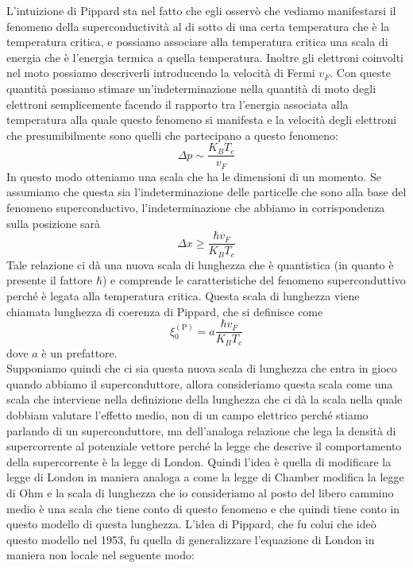 L'intuizione di Pippard sta nel fatto che egli osservò che vediamo manifestarsi il fenomeno della superconductività al di sotto di una certa temperatura che è la temperatura critica, e possiamo associare alla temperatura critica una scala di energia che è l'energia termica a quella temperatura. Inoltre gli elettroni coinvolti nel moto possiamo descriverli introducendo la velocità di Fermi $v_F$. Con queste quantità possiamo stimare un'indeterminazione nella quantità di moto degli elettroni semplicemente facendo il rapporto tra l'energia associata alla temperatura alla quale questo fenomeno si manifesta e la velocità degli elettroni che presumibilmente sono quelli che partecipano a questo fenomeno:
\begin{equation*}
   \Delta p
   \sim \frac{K_B T_c}{v_F}
\end{equation*}
In questo modo otteniamo una scala che ha le dimensioni di un momento. Se assumiamo che questa sia l'indeterminazione delle particelle che sono alla base del fenomeno superconductivo, l'indeterminazione che abbiamo in corrispondenza sulla posizione sarà
\begin{equation*}
   \Delta x
   \geq \frac{\hbar v_F}{K_B T_c}
\end{equation*}
Tale relazione ci dà una nuova scala di lunghezza che è quantistica (in quanto è presente il fattore $\hbar$) e comprende le caratteristiche del fenomeno superconduttivo perché è legata alla temperatura critica. Questa scala di lunghezza viene chiamata lunghezza di coerenza di Pippard, che si definisce come
\begin{equation*}
   \xi_0^{(\text{P})}
   =a \frac{\hbar v_F}{K_B T_c}
\end{equation*}
dove $a$ è un prefattore.\\
Supponiamo quindi che ci sia questa nuova scala di lunghezza che entra in gioco quando abbiamo il superconduttore, allora consideriamo questa scala come una scala che interviene nella definizione della lunghezza che ci dà la scala nella quale dobbiam valutare l'effetto medio, non di un campo elettrico perché stiamo parlando di un superconduttore, ma dell'analoga relazione che lega la densità di supercorrente al potenziale vettore perché la legge che descrive il comportamento della supercorrente è la legge di London. Quindi l'idea è quella di modificare la legge di London in maniera analoga a come la legge di Chamber modifica la legge di Ohm e la scala di lunghezza che io consideriamo al posto del libero cammino medio è una scala che tiene conto di questo fenomeno e che quindi tiene conto in questo modello di questa lunghezza. L'idea di Pippard, che fu colui che ideò questo modello nel 1953, fu quella di generalizzare l'equazione di London in maniera non locale nel seguente modo:
